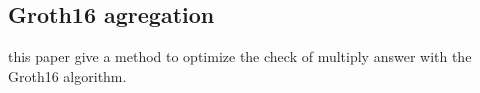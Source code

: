 \subsection{Groth16 agregation}
\cite{Practical_Groth16_Aggregation} this paper give a method to optimize the check of multiply answer with the Groth16 algorithm.